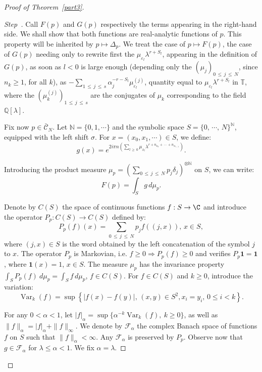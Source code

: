 \documentclass[AHL,Unicode,longabstracts,published]{cedram}
\newcommand{\Tbb}{\mathbb T}
\newcommand{\Qbb}{\mathbb Q}
\newcommand{\Nbb}{\mathbb N}
\newcommand{\Ccl}{\mathcal{C}}
\newcommand{\Fcl}{\mathcal{F}}
\newcommand{\bfun}{\mathbf{1}}
\DeclareMathOperator{\Var}{Var}
\newcounter{stepcount}
\newenvironment{step}{\refstepcounter{stepcount}\begin{proof}[Step~\thestepcount]}{\let\qed\relax\end{proof}}
\begin{document}
\begin{proof}[{Proof of Theorem~\ref{part3}}]
\begin{step}
Call $F(p)$ and $G(p)$ respectively the terms appearing in the right-hand side. We shall show that both functions are real-analytic functions of $p$. This property will be inherited by $p\longmapsto \Delta_p$. We treat the case of $p\longmapsto F(p)$, the case of $G(p)$ needing only to rewrite first the $\mu_{\varepsilon_l}\lambda^{r+S_l}$, appearing in the definition of $G(p)$, as soon as $l<0$ is large enough (depending only the $(\mu_j)_{0\,\leq\,j\,\leq\,N}$, since $n_k\geq 1$, for all $k$), as $-\sum_{1\,\leq\,j\,\leq\,s}\alpha_j^{-r-S_l}\mu_{\varepsilon_l}^{(j)}$, quantity equal to $\mu_{\varepsilon_l}\lambda^{r+S_l}$ in $\Tbb$, where the $(\mu_k^{(j)})_{1\,\leq \,j\,\leq\,s}$ are the conjugates of $\mu_k$ corresponding to the field $\Qbb[\lambda]$.


Fix now $p\in\bar{\Ccl}_N$. Let $\Nbb=\{0,1,\cdots\}$ and the symbolic space $S=\{0,\,\cdots,\,N\}^{\Nbb}$, equipped with the left shift $\sigma$. For $x=(x_0,x_1,\cdots)\in S$, we define:
\[
g(x)=e^{2i\pi n\left({\sum_{l\,\geq\,0}\mu_{x_l}\lambda^{r+n_{x_0}+\,\cdots\,+n_{x_{l-1}}}}\right)}.
\]


Introducing the product measure $\mu_p=(\sum_{0\,\leq\,j\,\leq\,N}p_j\delta_j)^{\otimes\Nbb}$ on $S$, we can write:
\[
F(p)=\int_{S}g\,d\mu_p.
\]



Denote by $C(S)$ the space of continuous functions $f:S\rightarrow\C$ and introduce the operator $P_p:C(S)\rightarrow C(S)$ defined by:
\begin{equation}\label{pp}
P_p(f)(x)=\sum_{0\,\leq\,j\,\leq\,N}p_jf((j,x)),\,x\in S,
\end{equation}
where $(j,x)\in S$ is the word obtained by the left concatenation of the symbol $j$ to $x$. The operator $P_p$ is Markovian, i.e. $f\geq0\Rightarrow P_p(f)\geq0$ and verifies $P_p\bfun=\bfun$, where $\bfun(x)=1$, $x\in S$. The measure $\mu_p$ has the invariance property $\int_SP_p(f)~d\mu_p=\int_Sf\,d\mu_p$, $f\in C(S)$. For $f\in C(S)$ and $k\geq0$, introduce the variation:
\[
\Var_k(f)=\sup\left\{\left|f(x)-f(y)\right|,\,(x,y)\in S^2,x_i=y_i,\,0\leq i<k\right\}.
\]


For any $0<\alpha<1$, let $|f|_{\alpha}=\sup\{\alpha^{-k}\Var_k(f),~k\geq0\}$, as well as $\|f\|_{\alpha}=|f|_{\alpha}+\|f\|_{\infty}$. We denote by ${\Fcl}_{\alpha}$ the complex Banach space of functions $f$ on $S$ such that $\|f\|_{\alpha}<\infty$. Any ${\Fcl}_{\alpha}$ is preserved by $P_p$. Observe now that $g\in {\Fcl}_{\alpha}$ for $\lambda\leq\alpha<1$. We fix $\alpha=\lambda$.


\end{step}
\end{proof}
\end{document}
